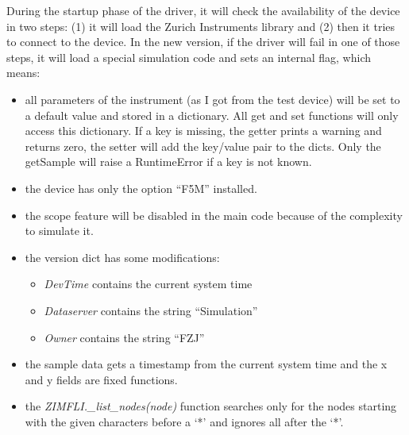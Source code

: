 \documentclass[11pt]{article} %
\begin{document}
During the startup phase of the driver, it will check the availability of the device in two steps: (1) it will load the Zurich Instruments library and (2) then it tries to connect to the device. In the new version, if the driver will fail in one of those steps, it will load a special simulation code and sets an internal flag, which means:
\begin{itemize}
\item all parameters of the instrument (as I got from the test device) will be set to a default value and stored in a dictionary. All get and set functions will only access this dictionary. If a key is missing, the getter prints a warning and returns zero, the setter will add the key/value pair to the dicts. Only the getSample  will raise a RuntimeError if a key is not known.
\item the device has only the option ``F5M'' installed.
\item the scope feature will be disabled in the main code because of the complexity to simulate it.
\item the version dict has some modifications:
\begin{itemize}
\item {\it DevTime} contains the current system time
\item {\it Dataserver} contains the string ``Simulation''
\item {\it Owner} contains the string ``FZJ''
\end{itemize}
\item the sample data gets a timestamp from the current system time and the x and y fields are fixed functions.
\item the {\it ZIMFLI.\_list\_nodes(node)} function searches only for the nodes starting with the given characters before a `*' and ignores all after the `*'.

\end{itemize}
\end{document}
